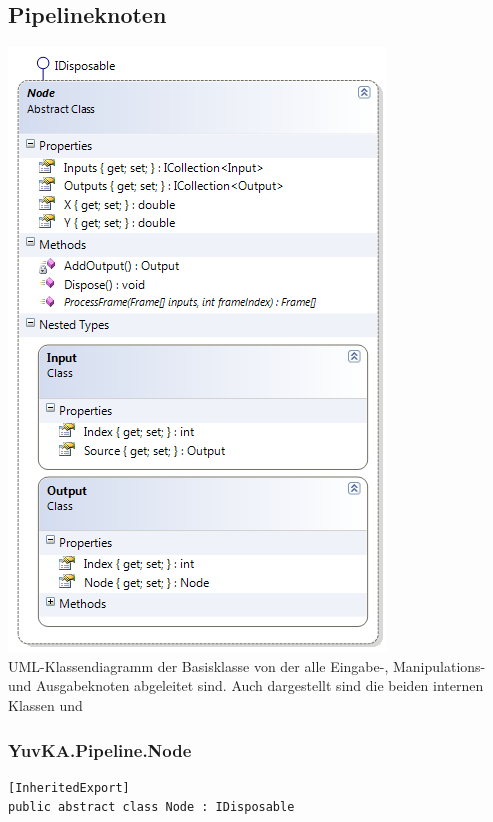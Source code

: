 
\subsection{Pipelineknoten}
\begin{center}\includegraphics[scale=0.7]{YuvKa.Pipeline/node.png} \\
UML-Klassendiagramm der Basisklasse  von der alle Eingabe-, Manipulations- und Ausgabeknoten abgeleitet sind. Auch dargestellt sind die beiden internen Klassen  und 
\end{center}

\subsubsection{YuvKA.Pipeline.Node}

\begin{verbatim}
[InheritedExport]
public abstract class Node : IDisposable
\end{verbatim}

